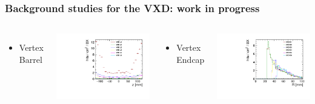 \documentclass[hyperref={colorlinks=true,pdfpagelabels=false,linkcolor=black}, xcolor=dvipsnames,10pt]{beamer}
\begin{document}
\begin{frame}
	\frametitle{Background studies for the VXD: work in progress}

	
	\begin{columns}
		\begin{itemize}
		\item Vertex Barrel
		\end{itemize}
		\centering
		\includegraphics[width=\textwidth]{../figures/occupancy_VXD_barrel.pdf}
		
		\begin{itemize}
		\item Vertex Endcap
		\end{itemize}
		\centering
		\includegraphics[width=\textwidth]{../figures/occupancy_VXD_endcap.pdf}
	\end{columns}
	

\end{frame}
\end{document}

